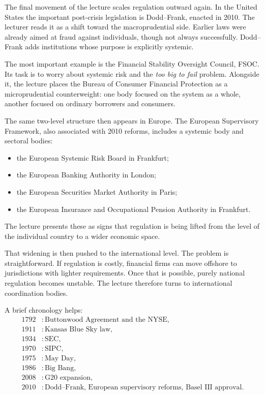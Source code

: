 The final movement of the lecture scales regulation outward again. In the United States the important post-crisis legislation is Dodd--Frank, enacted in 2010. The lecturer reads it as a shift toward the macroprudential side. Earlier laws were already aimed at fraud against individuals, though not always successfully. Dodd--Frank adds institutions whose purpose is explicitly systemic.

The most important example is the Financial Stability Oversight Council, FSOC. Its task is to worry about systemic risk and the \emph{too big to fail} problem. Alongside it, the lecture places the Bureau of Consumer Financial Protection as a microprudential counterweight: one body focused on the system as a whole, another focused on ordinary borrowers and consumers.

The same two-level structure then appears in Europe. The European Supervisory Framework, also associated with 2010 reforms, includes a systemic body and sectoral bodies:
\begin{itemize}
\item the European Systemic Risk Board in Frankfurt;
\item the European Banking Authority in London;
\item the European Securities Market Authority in Paris;
\item the European Insurance and Occupational Pension Authority in Frankfurt.
\end{itemize}

The lecture presents these as signs that regulation is being lifted from the level of the individual country to a wider economic space.

That widening is then pushed to the international level. The problem is straightforward. If regulation is costly, financial firms can move offshore to jurisdictions with lighter requirements. Once that is possible, purely national regulation becomes unstable. The lecture therefore turns to international coordination bodies.

A brief chronology helps:
\begin{align}
1792 &: \text{Buttonwood Agreement and the NYSE},\\
1911 &: \text{Kansas Blue Sky law},\\
1934 &: \text{SEC},\\
1970 &: \text{SIPC},\\
1975 &: \text{May Day},\\
1986 &: \text{Big Bang},\\
2008 &: \text{G20 expansion},\\
2010 &: \text{Dodd--Frank, European supervisory reforms, Basel III approval}.
\end{align}

